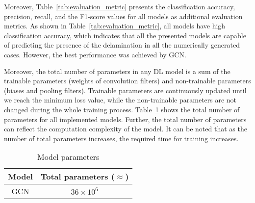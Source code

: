 \documentclass[runningheads]{llncs}
\begin{document}
Moreover, Table~\ref{tab:evaluation_metric} presents the classification accuracy, precision, recall, and the F1-score values for all models as additional evaluation metrics.
As shown in Table~\ref{tab:evaluation_metric}, all models have high classification accuracy, which indicates that all the presented models are capable of predicting the presence of the delamination in all the numerically generated cases. 
However, the best performance was achieved by GCN.


Moreover, the total number of parameters in any DL model is a sum of the trainable parameters (weights of convolution filters) and non-trainable parameters (biases and pooling filters).
Trainable parameters are continuously updated until we reach the minimum loss value, while the non-trainable parameters are not changed during the whole training process.
Table~\ref{tab:table_parameters} shows the total number of parameters for all implemented models.
Further, the total number of parameters can reflect the computation complexity of the model.
It can be noted that as the number of total parameters increases, the required time for training increases.
\begin{table}[]
	\centering
	\caption{Model parameters}
	\label{tab:table_parameters}
	\begin{tabular}{cc}\hline
		Model &  Total parameters (\(\approx\)) \\ \hline
		GCN & \(36\times 10^6\) \\ \hline
	\end{tabular}
\end{table}
\end{document}
